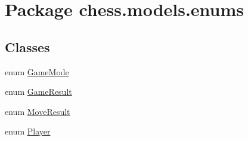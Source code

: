\hypertarget{namespacechess_1_1models_1_1enums}{}\section{Package chess.\+models.\+enums}
\label{namespacechess_1_1models_1_1enums}
\subsection*{Classes}
\begin{DoxyCompactItemize}
\item 
enum \mbox{\hyperlink{enumchess_1_1models_1_1enums_1_1_game_mode}{Game\+Mode}}
\item 
enum \mbox{\hyperlink{enumchess_1_1models_1_1enums_1_1_game_result}{Game\+Result}}
\item 
enum \mbox{\hyperlink{enumchess_1_1models_1_1enums_1_1_move_result}{Move\+Result}}
\item 
enum \mbox{\hyperlink{enumchess_1_1models_1_1enums_1_1_player}{Player}}
\end{DoxyCompactItemize}
